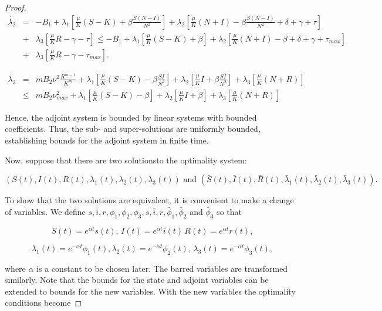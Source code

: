 \begin{proof}
\begin{eqnarray*}
	\dot{\lambda_2}&=& -B_1+\lambda_1\left[\frac{\mu}{K}(S-K)+\beta\frac{S(N-I)}{N^2}\right]+\lambda_2\left[\frac{\mu}{K}(N+I)-\beta\frac{S(N-I)}{N^2}+\delta+\gamma+\tau \right]\\
	&+&\lambda_3\left[\frac{\mu}{K}R-\gamma-\tau\right]\leq-B_1+\lambda_1\left[\frac{\mu}{K}(S-K)+\beta\right]+\lambda_2\left[\frac{\mu}{K}(N+I)-\beta+\delta+\gamma+\tau_{max} \right]\\
	&+&\lambda_3\left[\frac{\mu}{K}R-\gamma-\tau_{max}\right].
\end{eqnarray*}
	
\begin{eqnarray*}
	\dot{\lambda_3}&=& mB_2\nu^2\frac{R^{m-1}}{K^m}+\lambda_1\left[\frac{\mu}{K}(S-K)-\beta\frac{SI}{N^2}\right]+\lambda_2\left[\frac{\mu}{K}I+\beta\frac{SI}{N^2}\right]+\lambda_3\left[\frac{\mu}{K}(N+R)\right]\\
	&\leq& mB_2\nu^2_{max}+\lambda_1\left[\frac{\mu}{K}(S-K)-\beta\right]+\lambda_2\left[\frac{\mu}{K}I+\beta\right]+\lambda_3\left[\frac{\mu}{K}(N+R)\right]
\end{eqnarray*}

Hence, the adjoint system is bounded by linear systems with bounded coefficients. Thus, the sub- and super-solutions are uniformly bounded, establishing bounds for the adjoint system in finite time.

Now, suppose that there are two solutionsto the optimality system:

$$(S(t),I(t),R(t),\lambda_1(t),\lambda_2(t),\lambda_3(t))\,\,\mbox{and}\,\, (\bar{S}(t),\bar{I}(t),\bar{R}(t),\bar{\lambda}_1(t),\bar{\lambda}_2(t),\bar{\lambda}_3(t)).$$

To show that the two solutions are equivalent, it is convenient to make a change of variables. We define $s,i,r,\phi_1,\phi_2,\phi_3,\bar{s},\bar{i},\bar{r},\bar{\phi}_1,\bar{\phi}_2$ and $\bar{\phi}_3$ so that

$$S(t)=e^{\alpha t}s(t),\, I(t)=e^{\alpha t}i(t)\, R(t)=e^{\alpha t}r(t),$$

$$\lambda_1(t)=e^{-\alpha t}\phi_1(t), \lambda_2(t)=e^{-\alpha t}\phi_2(t),\, \lambda_3(t)=e^{-\alpha t}\phi_3(t),$$

where $\alpha$ is a constant to be chosen later. The barred variables are transformed similarly. Note that the bounds for the state and adjoint variables can be extended to bounds for the new variables. With the new variables the optimality conditions become


\end{proof}
